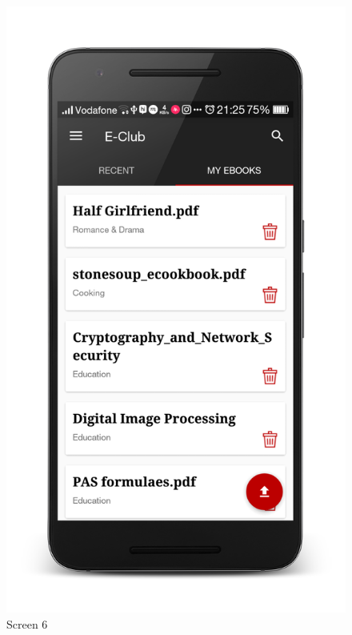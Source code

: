 \begin{figure}[ht]
\centering
\includegraphics[scale=0.13]{images/d12.png}
\caption{Screen 6}
\end{figure}

\newpage

